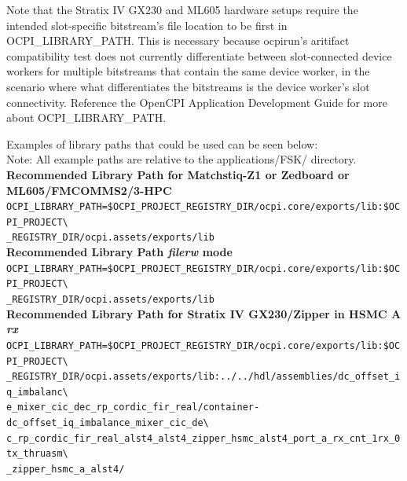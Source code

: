 \noindent Note that the Stratix IV GX230 and ML605 hardware setups require the intended slot-specific bitstream's file location to be first in OCPI\_LIBRARY\_PATH. This is necessary because ocpirun's aritifact compatibility test does not currently differentiate between slot-connected device workers for multiple bitstreams that contain the same device worker, in the scenario where what differentiates the bitstreams is the device worker's slot connectivity. Reference the OpenCPI Application Development Guide for more about OCPI\_LIBRARY\_PATH. \par\medskip

\noindent Examples of library paths that could be used can be seen below:\\

Note: All example paths are relative to the applications/FSK/ directory.\\

\noindent\textbf{Recommended Library Path for Matchstiq-Z1 or Zedboard or ML605/FMCOMMS2/3-HPC}\\
\verb|OCPI_LIBRARY_PATH=$OCPI_PROJECT_REGISTRY_DIR/ocpi.core/exports/lib:$OCPI_PROJECT\| \\
\verb|_REGISTRY_DIR/ocpi.assets/exports/lib| \\

\noindent\textbf{Recommended Library Path \textit{filerw} mode}\\
\verb|OCPI_LIBRARY_PATH=$OCPI_PROJECT_REGISTRY_DIR/ocpi.core/exports/lib:$OCPI_PROJECT\| \\
\verb|_REGISTRY_DIR/ocpi.assets/exports/lib| \\

\noindent\textbf{Recommended Library Path for Stratix IV GX230/Zipper in HSMC A}\\
\noindent\textbf{\textit{rx}}\\
\verb|OCPI_LIBRARY_PATH=$OCPI_PROJECT_REGISTRY_DIR/ocpi.core/exports/lib:$OCPI_PROJECT\| \\
\verb|_REGISTRY_DIR/ocpi.assets/exports/lib:../../hdl/assemblies/dc_offset_iq_imbalanc\| \\
\verb|e_mixer_cic_dec_rp_cordic_fir_real/container-dc_offset_iq_imbalance_mixer_cic_de\| \\
\verb|c_rp_cordic_fir_real_alst4_alst4_zipper_hsmc_alst4_port_a_rx_cnt_1rx_0tx_thruasm\| \\
\verb|_zipper_hsmc_a_alst4/| \\

